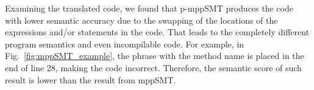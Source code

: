 Examining the translated code, we found that p-mppSMT produces the
code with lower semantic accuracy due to the swapping of the locations
of the expressions and/or statements in the code. That leads to the
completely different program semantics and even incompilable code. For
example, in Fig.~\ref{fig:mppSMT_example}, the phrase with the method
name  is placed in the end of line 28, making the code
incorrect. Therefore, the semantic score of such result is lower
than the result from mppSMT.

%






